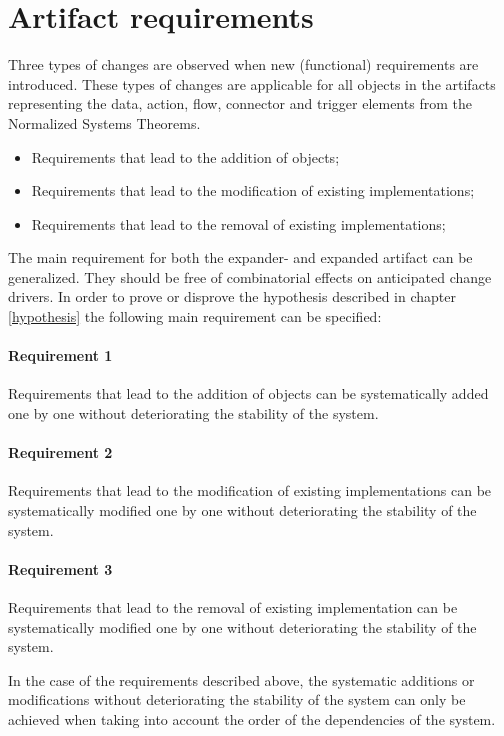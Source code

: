 \chapter{Artifact requirements} \label{chap:artifact_requirements} 

Three types of changes are observed when new (functional) requirements are
introduced. These types of changes are applicable for all objects in the artifacts
representing the data, action, flow, connector and trigger elements from the Normalized
Systems Theorems.
\begin{itemize}
    \item Requirements that lead to the addition of objects;
    \item Requirements that lead to the modification of existing implementations;
    \item Requirements that lead to the removal of existing implementations;
\end{itemize} 

The main requirement for both the expander- and expanded artifact can be generalized. They
should be free of combinatorial effects on anticipated change drivers. In order to prove
or disprove the hypothesis described in chapter \ref{hypothesis} the following main
requirement can be specified:

\subsubsection*{Requirement 1}
Requirements that lead to the addition of objects can be systematically added one by one
without deteriorating the stability of the system.

\subsubsection*{Requirement 2}
Requirements that lead to the modification of existing implementations can be
systematically modified one by one without deteriorating the stability of the system.

\subsubsection*{Requirement 3}
Requirements that lead to the removal of existing implementation can be systematically
modified one by one without deteriorating the stability of the system.

In the case of the requirements described above, the systematic additions or modifications
without deteriorating the stability of the system can only be achieved when taking into
account the order of the dependencies of the system.